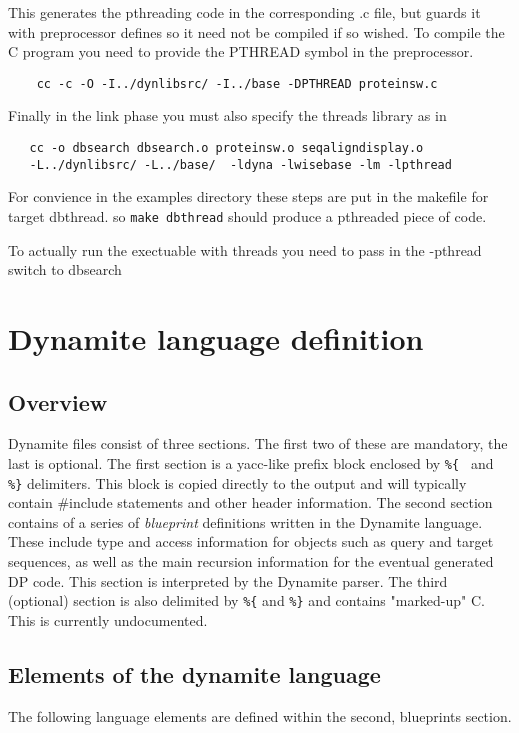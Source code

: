 This generates the pthreading code in the corresponding .c file, but guards it with
preprocessor defines so it need not be compiled if so wished. To compile the C program
you need to provide the PTHREAD symbol in the preprocessor.
\begin{verbatim}
	cc -c -O -I../dynlibsrc/ -I../base -DPTHREAD proteinsw.c
\end{verbatim}

Finally in the link phase you must also specify the threads library as in
\begin{verbatim}
   cc -o dbsearch dbsearch.o proteinsw.o seqaligndisplay.o 
   -L../dynlibsrc/ -L../base/  -ldyna -lwisebase -lm -lpthread
\end{verbatim}

For convience in the examples directory these steps are put in the makefile for 
target dbthread. so {\tt make dbthread} should produce a pthreaded piece
of code.

To actually run the exectuable with threads you need to pass in the -pthread
switch to dbsearch

\newpage

\section{Dynamite language definition}
\subsection{Overview}
Dynamite files consist of three sections.
The first two of these are mandatory, the last is optional.
The first section is a yacc-like prefix block enclosed by {\tt \%\{ }
and {\tt \%\}} delimiters. This block is copied directly to the output
and will typically contain \#include statements and other
header information.
The second section contains of a series of \emph{blueprint} definitions
written in the Dynamite language.
These include type and access information for objects such as query and
target sequences, as well as the main recursion information for the
eventual generated DP code.
This section is interpreted by the Dynamite parser.
The third (optional) section is also delimited by {\tt \%\{} and {\tt \%\}}
and contains "marked-up" C. This is currently undocumented.

\subsection{Elements of the dynamite language}
The following language elements are defined within the 
second, blueprints section.

